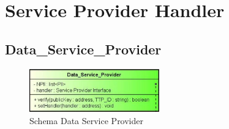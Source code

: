 \section{Service Provider Handler}
\subsection{Data\_Service\_Provider}
\begin{figure}[!h]
	\centering
	\includegraphics[width=0.5\textwidth]{immagini/dataSP}
	\caption{Schema Data Service Provider}
\end{figure}
